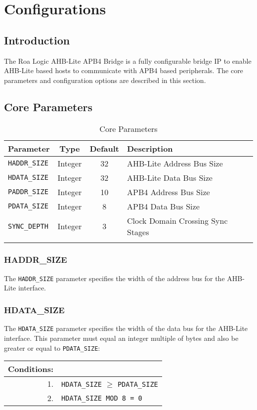 \chapter{Configurations}\label{configurations}

\section{Introduction}\label{introduction-1}

The Roa Logic AHB-Lite APB4
Bridge is a fully configurable bridge IP to enable AHB-Lite based hosts
to communicate with APB4 based peripherals. The core parameters and
configuration options are described in this section.

\section{Core Parameters}\label{core-parameters}

\begin{longtable}[]{@{}lccl@{}}
	\toprule
	Parameter & Type & Default & Description\tabularnewline
	\midrule
	\endhead
	\texttt{HADDR\_SIZE} & Integer & 32 & AHB-Lite Address Bus Size\tabularnewline
	\texttt{HDATA\_SIZE} & Integer & 32 & AHB-Lite Data Bus Size\tabularnewline
	\texttt{PADDR\_SIZE} & Integer & 10 & APB4 Address Bus Size\tabularnewline
	\texttt{PDATA\_SIZE} & Integer & 8  & APB4 Data Bus Size\tabularnewline
	\texttt{SYNC\_DEPTH} & Integer & 3  & Clock Domain Crossing Sync
	Stages\tabularnewline
	\bottomrule
	\caption{Core Parameters}
\end{longtable}

\subsection{HADDR\_SIZE}\label{haddr_size}

The \texttt{HADDR\_SIZE} parameter specifies the width of the address bus for the
AHB-Lite interface.

\subsection{HDATA\_SIZE}\label{hdata_size}

The \texttt{HDATA\_SIZE} parameter specifies the width of the data bus for the
AHB-Lite interface. This parameter must equal an integer multiple of
bytes and also be greater or equal to \texttt{PDATA\_SIZE}:

\begin{longtable}[]{@{}|rp{12cm}@{}}
	\textbf{Conditions}: & \\
	\endhead
	1. & \texttt{HDATA\_SIZE} $\geqslant$ \texttt{PDATA\_SIZE}\\
	2. & \texttt{HDATA\_SIZE MOD 8 = 0}\\
\end{longtable}	            

